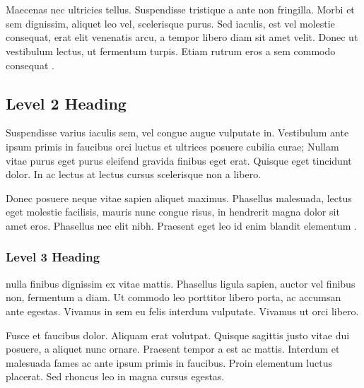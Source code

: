 \section{\titlet}
\vspace{0.5\baselineskip}   %




Maecenas nec ultricies tellus. Suspendisse tristique a ante non fringilla. Morbi et sem dignissim, aliquet leo vel, scelerisque purus. Sed iaculis, est vel molestie consequat, erat elit venenatis arcu, a tempor libero diam sit amet velit. Donec ut vestibulum lectus, ut fermentum turpis. Etiam rutrum eros a sem commodo consequat \parencite{Ludtkeetal2008}.

\subsection{Level 2 Heading}

Suspendisse varius iaculis sem, vel congue augue vulputate in. Vestibulum ante ipsum primis in faucibus orci luctus et ultrices posuere cubilia curae; Nullam vitae purus eget purus eleifend gravida finibus eget erat. Quisque eget tincidunt dolor. In ac lectus at lectus cursus scelerisque non a libero.

Donec posuere neque vitae sapien aliquet maximus. Phasellus malesuada, lectus eget molestie facilisis, mauris nunc congue risus, in hendrerit magna dolor sit amet eros. Phasellus nec elit nibh. Praesent eget leo id enim blandit elementum \parencite{Marshetal2009}.

\subsubsection{Level 3 Heading}

\textcite{Marshetal2009} nulla finibus dignissim ex vitae mattis. Phasellus ligula sapien, auctor vel finibus non, fermentum a diam. Ut commodo leo porttitor libero porta, ac accumsan ante egestas. Vivamus in sem eu felis interdum vulputate. Vivamus ut orci libero.

Fusce et faucibus dolor. Aliquam erat volutpat. Quisque sagittis justo vitae dui posuere, a aliquet nunc ornare. Praesent tempor a est ac mattis. Interdum et malesuada fames ac ante ipsum primis in faucibus. Proin elementum luctus placerat. Sed rhoncus leo in magna cursus egestas.

